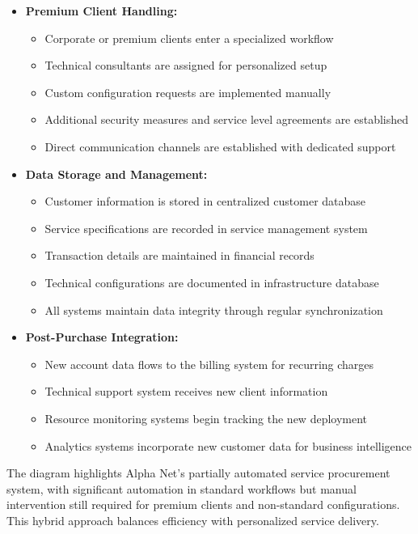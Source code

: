 \begin{itemize}
    \item \textbf{Premium Client Handling:}
    \begin{itemize}
        \item Corporate or premium clients enter a specialized workflow
        \item Technical consultants are assigned for personalized setup
        \item Custom configuration requests are implemented manually
        \item Additional security measures and service level agreements are established
        \item Direct communication channels are established with dedicated support
    \end{itemize}

    \item \textbf{Data Storage and Management:}
    \begin{itemize}
        \item Customer information is stored in centralized customer database
        \item Service specifications are recorded in service management system
        \item Transaction details are maintained in financial records
        \item Technical configurations are documented in infrastructure database
        \item All systems maintain data integrity through regular synchronization
    \end{itemize}

    \item \textbf{Post-Purchase Integration:}
    \begin{itemize}
        \item New account data flows to the billing system for recurring charges
        \item Technical support system receives new client information
        \item Resource monitoring systems begin tracking the new deployment
        \item Analytics systems incorporate new customer data for business intelligence
    \end{itemize}
\end{itemize}

The diagram highlights Alpha Net's partially automated service procurement system, with 
significant automation in standard workflows but manual intervention still required for 
premium clients and non-standard configurations. This hybrid approach balances efficiency 
with personalized service delivery.


